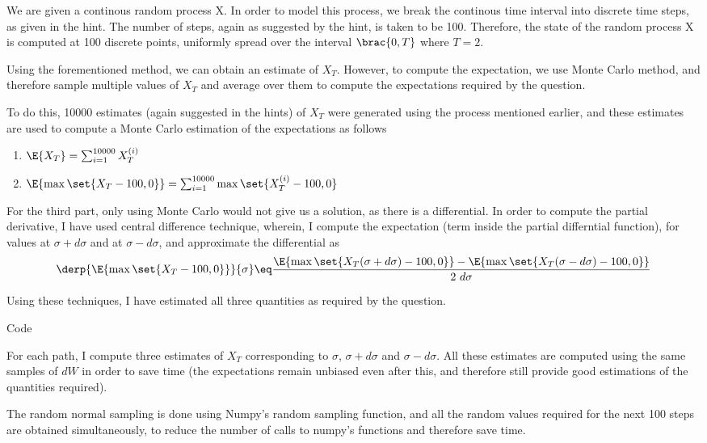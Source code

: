 \documentclass{article}
\begin{document}
\begin{question}

	We are given a continous random process X. In order to model this process, we break the continous time interval into discrete time steps, as given in the hint. The number of steps, again as suggested by the hint, is taken to be 100. Therefore, the state of the random process X is computed at 100 discrete points, uniformly spread over the interval $\brac{0, T}$ where $T = 2$.

	Using the forementioned method, we can obtain an estimate of $X_T$. However, to compute the expectation, we use Monte Carlo method, and therefore sample multiple values of $X_T$ and average over them to compute the expectations required by the question.

	To do this, 10000 estimates (again suggested in the hints) of $X_T$ were generated using the process mentioned earlier, and these estimates are used to compute a Monte Carlo estimation of the expectations as follows
	\begin{enumerate}
		\item $\E{X_T} = \sum_{i = 1}^{10000} X_T^{(i)}$
		\item $\E{\max\set{X_T - 100, 0}} = \sum_{i = 1}^{10000} \max\set{X_T^{(i)} - 100, 0}$
	\end{enumerate}

	For the third part, only using Monte Carlo would not give us a solution, as there is a differential. In order to compute the partial derivative, I have used central difference technique, wherein, I compute the expectation (term inside the partial differntial function), for values at $\sigma + d\sigma$ and at $\sigma - d\sigma$, and approximate the differential as
	\[ \derp{\E{\max\set{X_T - 100, 0}}}{\sigma} \eq \frac{\E{\max\set{X_T(\sigma + d\sigma) - 100, 0}} - \E{\max\set{X_T(\sigma - d\sigma) - 100, 0}}}{2\ d\sigma} \]

	Using these techniques, I have estimated all three quantities as required by the question.

	\begin{qsection}{Code}

		For each path, I compute three estimates of $X_T$ corresponding to $\sigma$, $\sigma + d\sigma$ and $\sigma - d\sigma$. All these estimates are computed using the same samples of $dW$ in order to save time (the expectations remain unbiased even after this, and therefore still provide good estimations of the quantities required).

		The random normal sampling is done using Numpy's random sampling function, and all the random values required for the next 100 steps are obtained simultaneously, to reduce the number of calls to numpy's functions and therefore save time.


\end{qsection}
\end{question}
\end{document}
